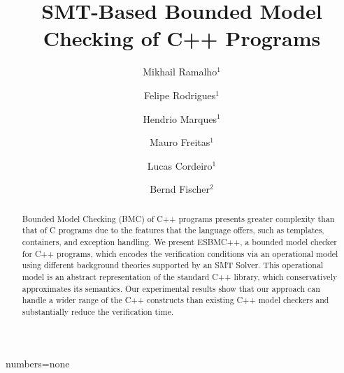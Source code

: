 \documentclass[a4paper]{llncs}
\begin{document}
{numbers=none}
\lstset{language=C,basicstyle=\small}
\lstset{numbers=left, numberstyle=\tiny, stepnumber=1, numbersep=5pt}
\lstset{tabsize=2}
\lstset{firstnumber=1}
\lstset{frame=single}


\title{SMT-Based Bounded Model Checking of C++ Programs}
\author{Mikhail Ramalho$^1$ 	\and
	Felipe Rodrigues$^1$   	\and
	Hendrio Marques$^1$   	\and
	Mauro Freitas$^1$   	\and
	Lucas Cordeiro$^1$   	\and
	Bernd Fischer$^2$}

\maketitle

\begin{abstract}
Bounded Model Checking (BMC) of C++ programs presents greater
complexity than that of C programs due to the features that the language offers, such as
templates, containers, and exception handling. We present ESBMC++, a bounded
model checker for C++ programs, which encodes the verification conditions via
an operational model using different background theories supported
by an SMT Solver. This operational model is an abstract representation of
the standard C++ library, which conservatively approximates its semantics. Our
experimental results show that our approach can handle a wider range of the C++
constructs than existing C++ model checkers and substantially reduce the verification time.
\end{abstract}

\end{document}
